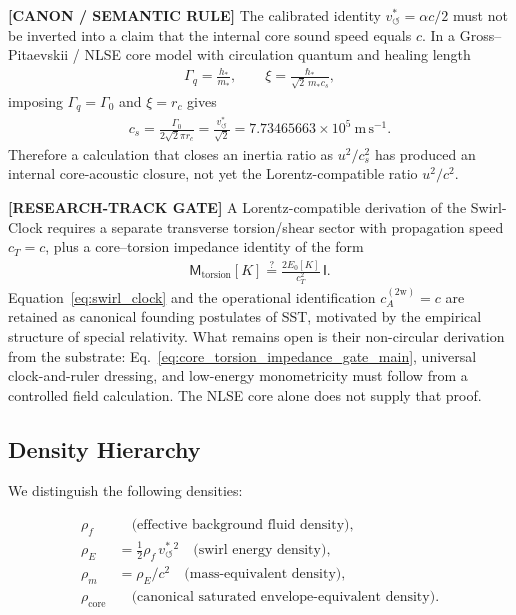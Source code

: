 \documentclass[11pt]{article}
\theoremstyle{definition}
\theoremstyle{plain}
\theoremstyle{remark}
\newcommand{\rhoF}{{\rho_{\!f}}}
\newcommand{\rhoE}{\rho_{\!E}}
\newcommand{\rhoM}{\rho_{\!m}}
\newcommand{\rhocore}{\rho_{\mathrm{core}}}
\newcommand{\rc}{{r_c}}
\newcommand{\vchar}{v_{\!\boldsymbol{\circlearrowleft}}^{\ast}}
\begin{document}
        \textbf{[CANON / SEMANTIC RULE]} The calibrated identity \(\vchar=\alpha c/2\) must not be inverted into a claim that the internal core sound speed equals \(c\).  In a Gross--Pitaevskii / NLSE core model with circulation quantum and healing length
        \begin{align}
            \Gamma_q = \frac{h_*}{m_*},
            \qquad
            \xi = \frac{\hbar_*}{\sqrt{2}\,m_* c_s},
        \end{align}
        imposing \(\Gamma_q=\Gamma_0\) and \(\xi=\rc\) gives
        \begin{align}
            c_s
            =
            \frac{\Gamma_0}{2\sqrt{2}\pi\rc}
            =
            \frac{\vchar}{\sqrt{2}}
            =
            7.73465663\times10^{5}\ \mathrm{m\,s^{-1}}.
            \label{eq:core_sound_speed_vchar_over_sqrt2}
        \end{align}
        Therefore a calculation that closes an inertia ratio as \(u^2/c_s^2\) has produced an internal core-acoustic closure, not yet the Lorentz-compatible ratio \(u^2/c^2\).

        \textbf{[RESEARCH-TRACK GATE]} A Lorentz-compatible derivation of the Swirl-Clock requires a separate transverse torsion/shear sector with propagation speed \(c_T=c\), plus a core--torsion impedance identity of the form
        \begin{align}
            \mathsf M_{\mathrm{torsion}}[K]
            \stackrel{?}{=}
            \frac{2E_0[K]}{c_T^2}\,\mathsf I .
            \label{eq:core_torsion_impedance_gate_main}
        \end{align}
        Equation~\eqref{eq:swirl_clock} and the operational identification \(c_A^{(2\mathrm w)}=c\) are retained as canonical founding postulates of SST, motivated by the empirical structure of special relativity. What remains open is their non-circular derivation from the substrate: Eq.~\eqref{eq:core_torsion_impedance_gate_main}, universal clock-and-ruler dressing, and low-energy monometricity must follow from a controlled field calculation. The NLSE core alone does not supply that proof.

    \subsection{Density Hierarchy}
        
        We distinguish the following densities:
        
        \begin{align}
            \rhoF &\quad \text{(effective background fluid density)}, \\
            \rhoE &= \tfrac12 \rhoF \, \vchar{}^2 \quad \text{(swirl energy density)}, \\
            \rhoM &= \rhoE / c^2 \quad \text{(mass-equivalent density)}, \\
            \rhocore &\quad \text{(canonical saturated envelope-equivalent density)}.
        \end{align}
\end{document}
